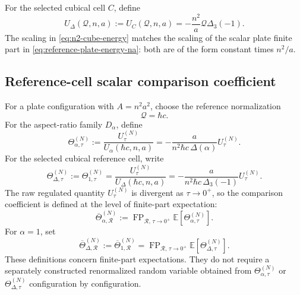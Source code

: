 \documentclass[11pt]{article}
\newcommand{\E}{\mathbb{E}}
\newcommand{\FP}{\operatorname{FP}}
\begin{document}
For the selected cubical cell \(C\), define
\begin{equation}
    U_{\Delta}(\mathcal Q,n,a)
    :=
    U_C(\mathcal Q,n,a)
    =
    -\frac{n^2}{a}\mathcal Q\Delta_3(-1).
    \label{eq:n2-cube-energy}
\end{equation}
The scaling in \eqref{eq:n2-cube-energy} matches the scaling of the scalar
plate finite part in \eqref{eq:reference-plate-energy-na}: both are of the
form constant times \(n^2/a\).

\subsection{Reference-cell scalar comparison coefficient}
\label{sec:trace-ratio}

For a plate configuration with \(A=n^2a^2\), choose the reference
normalization
\[
    \mathcal Q=\hbar c.
\]
For the aspect-ratio family \(D_\alpha\), define
\begin{equation}
    \Theta_{\alpha,\tau}^{(N)}
    :=
    \frac{U_\tau^{(N)}}{U_\alpha(\hbar c,n,a)}
    =
    -\frac{a}{n^2\hbar c\,\Delta(\alpha)}U_\tau^{(N)}.
    \label{eq:regulated-theta-alpha-ratio}
\end{equation}
For the selected cubical reference cell, write
\begin{equation}
    \Theta_{\Delta,\tau}^{(N)}
    :=
    \Theta_{1,\tau}^{(N)}
    =
    \frac{U_\tau^{(N)}}{U_{\Delta}(\hbar c,n,a)}
    =
    -\frac{a}{n^2\hbar c\,\Delta_3(-1)}U_\tau^{(N)}.
    \label{eq:regulated-theta-ratio}
\end{equation}
The raw regulated quantity \(U_\tau^{(N)}\) is divergent as
\(\tau\to0^+\), so the comparison coefficient is defined at the level of
finite-part expectation:
\begin{equation}
    \overline{\Theta}_{\alpha,\mathcal R}^{(N)}
    :=
    \FP_{\mathcal R,\,\tau\to0^+}
    \E[\Theta_{\alpha,\tau}^{(N)}].
    \label{eq:expected-theta-alpha-def}
\end{equation}
For \(\alpha=1\), set
\begin{equation}
    \overline{\Theta}_{\Delta,\mathcal R}^{(N)}
    :=
    \overline{\Theta}_{1,\mathcal R}^{(N)}
    =
    \FP_{\mathcal R,\,\tau\to0^+}
    \E[\Theta_{\Delta,\tau}^{(N)}].
    \label{eq:expected-theta-def}
\end{equation}
These definitions concern finite-part expectations.  They do not require a
separately constructed renormalized random variable obtained from
\(\Theta_{\alpha,\tau}^{(N)}\) or \(\Theta_{\Delta,\tau}^{(N)}\)
configuration by configuration.
\end{document}
